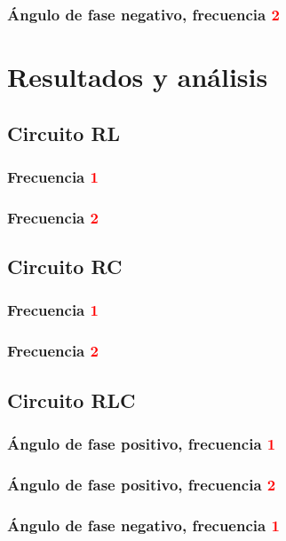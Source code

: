\documentclass[twocolumn,11pts]{IEEEtran}
\begin{document}
\subsubsection{Ángulo de fase negativo, frecuencia \textcolor{red}{2}}



\section{Resultados y análisis}
\subsection{Circuito RL}
\subsubsection{Frecuencia \textcolor{red}{1}}
\subsubsection{Frecuencia \textcolor{red}{2}}
\subsection{Circuito RC}
\subsubsection{Frecuencia \textcolor{red}{1}}
\subsubsection{Frecuencia \textcolor{red}{2}}
\subsection{Circuito RLC}



\subsubsection{Ángulo de fase positivo, frecuencia \textcolor{red}{1}}

\subsubsection{Ángulo de fase positivo, frecuencia \textcolor{red}{2}}

\subsubsection{Ángulo de fase negativo, frecuencia \textcolor{red}{1}}
\end{document}
